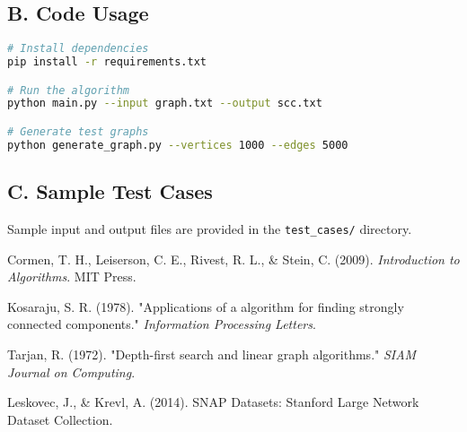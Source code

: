\documentclass[12pt]{article}
\begin{document}
\subsection*{B. Code Usage}
\begin{lstlisting}[language=bash]
# Install dependencies
pip install -r requirements.txt

# Run the algorithm
python main.py --input graph.txt --output scc.txt

# Generate test graphs
python generate_graph.py --vertices 1000 --edges 5000
\end{lstlisting}

\subsection*{C. Sample Test Cases}
Sample input and output files are provided in the \texttt{test\_cases/} directory.

\begin{thebibliography}{9}
Cormen, T. H., Leiserson, C. E., Rivest, R. L., \& Stein, C. (2009). 
\textit{Introduction to Algorithms}. MIT Press.

Kosaraju, S. R. (1978). 
"Applications of a algorithm for finding strongly connected components."
\textit{Information Processing Letters}.

Tarjan, R. (1972). 
"Depth-first search and linear graph algorithms." 
\textit{SIAM Journal on Computing}.

Leskovec, J., \& Krevl, A. (2014). 
{SNAP Datasets: Stanford Large Network Dataset Collection}.
\end{thebibliography}
\end{document}
